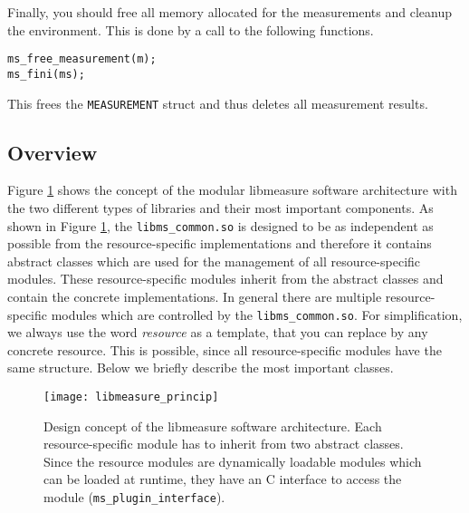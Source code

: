 Finally, you should free all memory allocated for the measurements and cleanup the environment. This is done by a call to the following functions.
\begin{lstlisting}[caption={Environment cleanup and freeing memory.},label=lst:cleanupMS]
ms_free_measurement(m);
ms_fini(ms);
\end{lstlisting}
This frees the \texttt{MEASUREMENT} struct and thus deletes all measurement results.


\subsection{Overview}
Figure \ref{fig:libmeasure_principle} shows the concept of the modular libmeasure software architecture with the two different types of libraries and their most important components. As shown in Figure \ref{fig:libmeasure_principle}, the \texttt{libms\_common.so} is designed to be as independent as possible from the resource-specific implementations and therefore it contains abstract classes which are used for the management of all resource-specific modules. These resource-specific modules inherit from the abstract classes and contain the concrete implementations. In general there are multiple resource-specific modules which are controlled by the \texttt{libms\_common.so}. For simplification, we always use the word \textit{resource} as a template, that you can replace by any concrete resource. This is possible, since all resource-specific modules have the same structure. Below we briefly describe the most important classes.

\begin{figure}
\begin{center}
\texttt{[image: libmeasure\_princip]} 
\caption{Design concept of the libmeasure software architecture. Each resource-specific module has to inherit from two abstract classes. Since the resource modules are dynamically loadable modules which can be loaded at runtime, they have an C interface to access the module (\texttt{ms\_plugin\_interface}).}
\label{fig:libmeasure_principle}
\end{center}
\end{figure}

